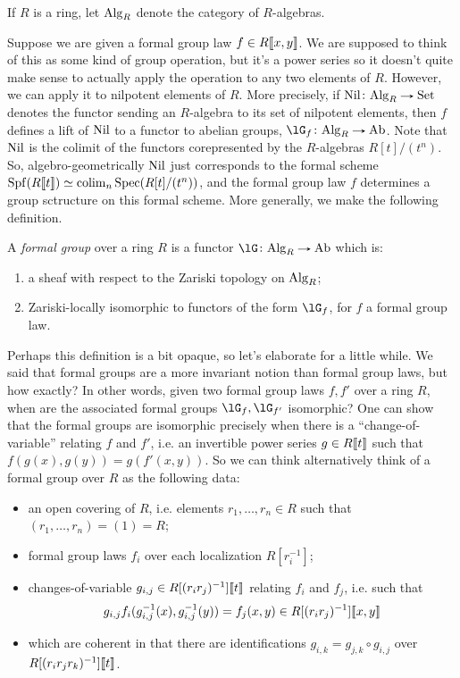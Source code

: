 \begin{notation}
  \label{chrom-algr}
  If $R$ is a ring, let $\mathrm{Alg}_R$ denote the category of $R$-algebras.
\end{notation}

Suppose we are given a formal group law $f \in R \llbracket x,y \rrbracket$. We
are supposed to think of this as some kind of group operation, but
it's a power series so it doesn't quite make sense to actually apply
the operation to any two elements of $R$. However, we can apply it to
nilpotent elements of $R$. More precisely, if
$\Nil \c \Alg_R \to \Set$ denotes the functor sending an $R$-algebra
to its set of nilpotent elements, then $f$ defines a lift of $\operatorname{Nil}$ to
a functor to abelian groups, $\lG_f \c \Alg_R \to \Ab$. Note that
$\operatorname{Nil}$ is the colimit of the functors corepresented by the
$R$-algebras $R[t]/(t^n)$. So, algebro-geometrically $\operatorname{Nil}$ just
corresponds to the formal scheme
$\operatorname{Spf}(R\llbracket t \rrbracket) \simeq \operatorname*{colim}_n \operatorname{Spec}(R[t]/(t^n))$, and the formal
group law $f$ determines a group sctructure on this formal
scheme. More generally, we make the following definition.

\begin{definition}
  \label{chrom-fg}
  A \emph{formal group} over a ring $R$ is a functor
  $\lG \c \Alg_R \to \Ab$ which is:
  \begin{enumerate}
  \item a sheaf with respect to the Zariski topology on $\mathrm{Alg}_R$;
  \item Zariski-locally isomorphic to functors of the form $\lG_f$,
    for $f$ a formal group law.
  \end{enumerate}
\end{definition}

Perhaps this definition is a bit opaque, so let's elaborate for a
little while. We said that formal groups are a more invariant notion
than formal group laws, but how exactly? In other words, given two
formal group laws $f,f'$ over a ring $R$, when are the associated
formal groups $\lG_f, \lG_{f'}$ isomorphic? One can show that the
formal groups are isomorphic precisely when there is a
``change-of-variable'' relating $f$ and $f'$, i.e. an invertible power
series $g \in R \llbracket t \rrbracket$ such that $f(g(x),g(y)) = g(f'(x,y))$. So
we can think alternatively think of a formal group over $R$ as the
following data:
\begin{itemize}
\item an open covering of $R$, i.e. elements $r_1,\ldots,r_n \in R$
  such that $(r_1,\ldots,r_n) = (1) = R$;
\item formal group laws $f_i$ over each localization $R[r_i^{-1}]$;
\item changes-of-variable $g_{i,j} \in R[(r_ir_j)^{-1}] \llbracket t \rrbracket$
  relating $f_i$ and $f_j$, i.e. such that
  \[
  g_{i,j}f_i(g_{i,j}^{-1}(x),g_{i,j}^{-1}(y)) = f_j(x,y) \in
  R[(r_ir_j)^{-1}] \llbracket x,y \rrbracket
  \]
\item which are coherent in that there are identifications
  $g_{i,k} = g_{j,k} \circ g_{i,j}$ over
  $R[(r_ir_jr_k)^{-1}] \llbracket t \rrbracket$.
\end{itemize}

